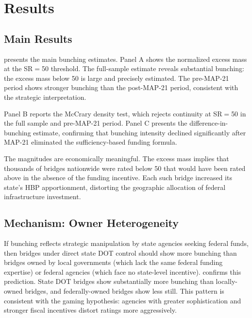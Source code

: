 \documentclass[12pt]{article}
\begin{document}
\section{Results}

\subsection{Main Results}



 presents the main bunching estimates. Panel A shows the normalized excess mass at the SR$=$50 threshold. The full-sample estimate reveals substantial bunching: the excess mass below 50 is large and precisely estimated. The pre-MAP-21 period shows stronger bunching than the post-MAP-21 period, consistent with the strategic interpretation.

Panel B reports the McCrary density test, which rejects continuity at SR$=$50 in the full sample and pre-MAP-21 period. Panel C presents the difference-in-bunching estimate, confirming that bunching intensity declined significantly after MAP-21 eliminated the sufficiency-based funding formula.

The magnitudes are economically meaningful. The excess mass implies that thousands of bridges nationwide were rated below 50 that would have been rated above in the absence of the funding incentive. Each such bridge increased its state's HBP apportionment, distorting the geographic allocation of federal infrastructure investment.

\subsection{Mechanism: Owner Heterogeneity}



If bunching reflects strategic manipulation by state agencies seeking federal funds, then bridges under direct state DOT control should show more bunching than bridges owned by local governments (which lack the same federal funding expertise) or federal agencies (which face no state-level incentive).  confirms this prediction. State DOT bridges show substantially more bunching than locally-owned bridges, and federally-owned bridges show less still. This pattern is consistent with the gaming hypothesis: agencies with greater sophistication and stronger fiscal incentives distort ratings more aggressively.
\end{document}
